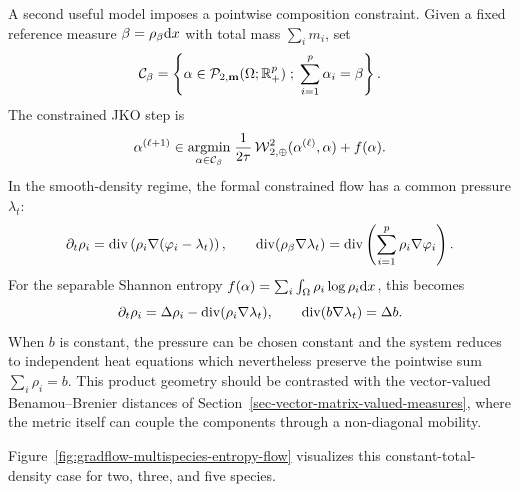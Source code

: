 A second useful model imposes a pointwise composition constraint. Given a fixed reference measure $\beta=\rho_{\beta}\mathrm{d} x$ with total mass $\sum_i m_i$, set
\begin{equation}\label{eq-multispecies-composition-constraint}
	\mathcal C_\beta=
	\left\{ \alpha\in\mathcal{P}_{2,\mathbf m}(\Omega;\mathbb{R}_+^p) \;;\; \sum_{i=1}^p \alpha_i=\beta \right\}.
\end{equation}
The constrained JKO step is
\begin{equation}\label{eq-multispecies-constrained-jko}
	\alpha^{(\ell+1)}
	\in
	\underset{\alpha\in\mathcal C_\beta}{\operatorname{argmin}}\;
		\frac{1}{2\tau}\operatorname{\mathcal{W}}_{2,\oplus}^2(\alpha^{(\ell)},\alpha)+f(\alpha).
\end{equation}
In the smooth-density regime, the formal constrained flow has a common pressure $\lambda_t$:
\begin{equation}\label{eq-multispecies-constrained-pde}
	\partial_t\rho_i=\operatorname{div}\left(\rho_i\nabla(\varphi_i-\lambda_t)\right),
	\qquad
		\operatorname{div}(\rho_{\beta}\nabla\lambda_t)=\operatorname{div}\left(\sum_{i=1}^p \rho_i\nabla\varphi_i\right).
\end{equation}
For the separable Shannon entropy $f(\alpha)=\sum_i\int_\Omega \rho_i\log\rho_i\mathrm{d} x$, this becomes
\begin{equation}\label{eq-multispecies-modified-heat}
	\partial_t\rho_i=\Delta\rho_i-\operatorname{div}(\rho_i\nabla\lambda_t),
	\qquad
	\operatorname{div}(b\nabla\lambda_t)=\Delta b.
\end{equation}
When $b$ is constant, the pressure can be chosen constant and the system reduces to independent heat equations which nevertheless preserve the pointwise sum $\sum_i\rho_i=b$. This product geometry should be contrasted with the vector-valued Benamou--Brenier distances of Section~\ref{sec-vector-matrix-valued-measures}, where the metric itself can couple the components through a non-diagonal mobility.

Figure~\ref{fig:gradflow-multispecies-entropy-flow} visualizes this constant-total-density case for two, three, and five species.

